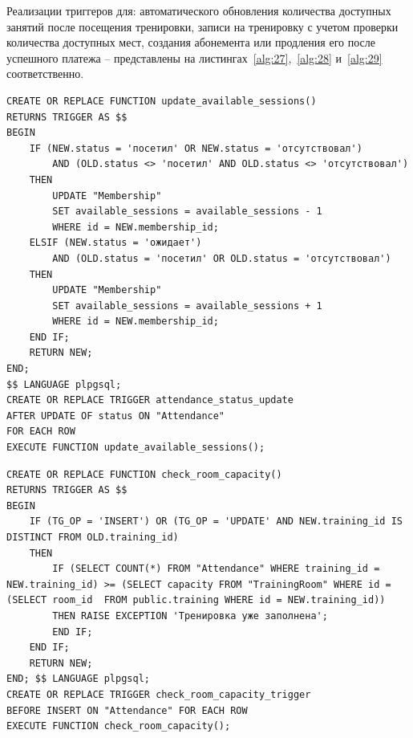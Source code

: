 Реализации триггеров для: автоматического обновления количества доступных занятий после посещения тренировки, записи на тренировку с учетом проверки количества доступных мест, создания абонемента или продления его после успешного платежа -- представлены на листингах~\ref{alg:27},~\ref{alg:28} и~\ref{alg:29} соответственно.

\begin{lstlisting}[label=alg:27, caption=Реализация триггера для автоматического обновления количества доступных занятий после посещения тренировки, captionpos=t]
CREATE OR REPLACE FUNCTION update_available_sessions()
RETURNS TRIGGER AS $$
BEGIN
	IF (NEW.status = 'посетил' OR NEW.status = 'отсутствовал') 
		AND (OLD.status <> 'посетил' AND OLD.status <> 'отсутствовал') 
	THEN
		UPDATE "Membership"
		SET available_sessions = available_sessions - 1
		WHERE id = NEW.membership_id;
	ELSIF (NEW.status = 'ожидает') 
		AND (OLD.status = 'посетил' OR OLD.status = 'отсутствовал') 
	THEN
		UPDATE "Membership"
		SET available_sessions = available_sessions + 1
		WHERE id = NEW.membership_id;
	END IF;
	RETURN NEW;
END;
$$ LANGUAGE plpgsql;
CREATE OR REPLACE TRIGGER attendance_status_update
AFTER UPDATE OF status ON "Attendance"
FOR EACH ROW
EXECUTE FUNCTION update_available_sessions();
\end{lstlisting}

\begin{lstlisting}[label=alg:28, caption=Реализация триггера для записи на тренировку с учетом проверки количества доступных мест, captionpos=t]
CREATE OR REPLACE FUNCTION check_room_capacity()
RETURNS TRIGGER AS $$
BEGIN
	IF (TG_OP = 'INSERT') OR (TG_OP = 'UPDATE' AND NEW.training_id IS DISTINCT FROM OLD.training_id) 
	THEN
		IF (SELECT COUNT(*) FROM "Attendance" WHERE training_id = NEW.training_id) >= (SELECT capacity FROM "TrainingRoom" WHERE id = (SELECT room_id  FROM public.training WHERE id = NEW.training_id))
		THEN RAISE EXCEPTION 'Тренировка уже заполнена';
		END IF;
	END IF;
	RETURN NEW;
END; $$ LANGUAGE plpgsql;
CREATE OR REPLACE TRIGGER check_room_capacity_trigger
BEFORE INSERT ON "Attendance" FOR EACH ROW
EXECUTE FUNCTION check_room_capacity();
\end{lstlisting}

